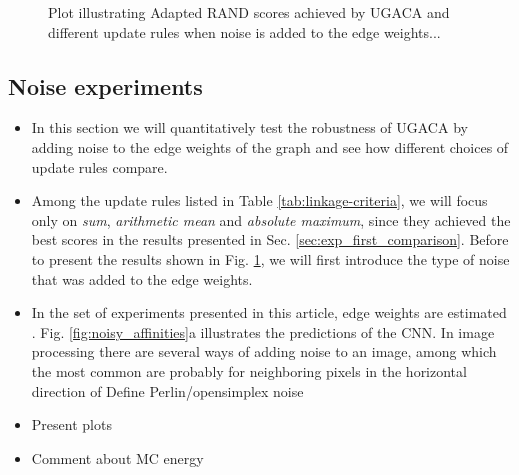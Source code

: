 \begin{figure}
\caption{Plot illustrating Adapted RAND scores achieved by UGACA and different update rules when noise is added to the edge weights... }\label{fig:noise_merge}
\end{figure}


\subsection{Noise experiments}
\begin{itemize}
    \item In this section we will quantitatively test the robustness of UGACA by adding noise to the edge weights of the graph and see how different choices of update rules compare.
    \item Among the update rules listed in Table \ref{tab:linkage-criteria}, we will focus only on \emph{sum}, \emph{arithmetic mean} and \emph{absolute maximum}, since they achieved the best scores in the results presented in Sec. \ref{sec:exp_first_comparison}. Before to present the results shown in Fig. \ref{fig:noise_merge}, we will first introduce the type of noise that was added to the edge weights.
\item In the set of experiments presented in this article, edge weights are estimated . Fig. \ref{fig:noisy_affinities}a illustrates the predictions of the CNN. In image processing there are several ways of adding noise to an image, among which the most common are probably  for neighboring pixels in the horizontal direction of Define Perlin/opensimplex noise
\item Present plots
\item Comment about MC energy
\end{itemize}




